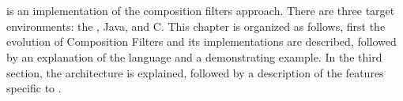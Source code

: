 \chapter{\Compose*{}}
\label{chp:ComposeStar}

\Compose* is an implementation of the composition filters approach. There are three target environments: the \dotNET, Java, and C.
This chapter is organized as follows, first the evolution of Composition Filters and its implementations are described, followed by an explanation of the \Compose* language and a demonstrating example. 
In the third section, the \Compose* architecture is explained, followed by a description of the features specific to \Compose*.













